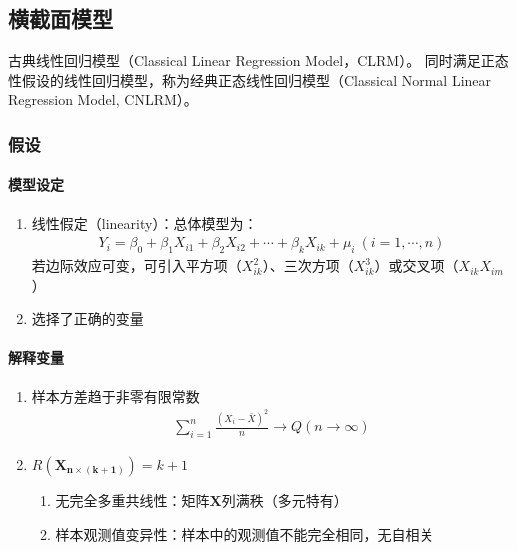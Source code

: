 \documentclass[12pt]{book}
\begin{document}
\subsection{横截面模型}







古典线性回归模型（Classical Linear Regression Model，CLRM）。 同时满足正态性假设的线性回归模型，称为经典正态线性回归模型（Classical Normal Linear Regression Model, CNLRM）。

\subsubsection{假设}

\paragraph{模型设定}


\begin{enumerate}[1.]
    \item 线性假定（linearity）：总体模型为：
          \begin{gather*}
              Y_i=\beta_0+\beta_1X_{i1}+\beta_2X_{i2}+\cdots+\beta_kX_{ik}+\mu_i\ \left(i=1,\cdots,n\right)
          \end{gather*}
          若边际效应可变，可引入平方项（$X_{ik}^2$）、三次方项（$X_{ik}^3$）或交叉项（$X_{ik}X_{im}$）
    \item 选择了正确的变量
\end{enumerate}




\paragraph{解释变量}


\begin{enumerate}[1.]
    \item 样本方差趋于非零有限常数
    \begin{gather*}
        \sum_{i=1}^{n}\frac{\left(X_i-\bar{X}\right)^2}{n}\rightarrow Q (n\rightarrow \infty )
    \end{gather*}
    \item $R\left(\bm{X}_{\bm{n}\times\left(\bm{k}+\bm{1}\right)}\right)=k+1$
    \begin{enumerate}[(1)]
        \item 无完全多重共线性：矩阵$\bm{X}$列满秩（多元特有）
        \item 样本观测值变异性：样本中的观测值不能完全相同，无自相关
    \end{enumerate}
\end{enumerate}
\end{document}

